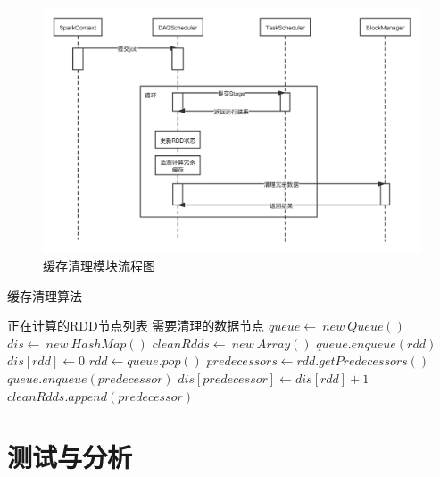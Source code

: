 \begin{figure}
    \centering
    \includegraphics[width=1\textwidth]{Img/缓存清理模块流程图.png}
    \caption{缓存清理模块流程图}
    \label{fig:clean}
\end{figure}

\begin{algorithm}  
    \caption{缓存清理算法}  
    \begin{algorithmic}[1] %
        \Require 正在计算的RDD节点列表
        \Ensure 需要清理的数据节点
            \State $queue \gets \ new \ Queue()$
            \State $dis \gets  \ new \ HashMap()$
            \State $cleanRdds \gets \ new \ Array()$
                \State $queue.enqueue(rdd)$
                \State $dis[rdd] \gets 0$
            \EndFor
                \State $rdd \gets queue.pop()$
                \State $predecessors \gets rdd.getPredecessors()$
                    \State $queue.enqueue(predecessor)$
                    \State $dis[predecessor] \gets dis[rdd]+1$
                        $cleanRdds.append(predecessor)$
                    \EndIf
                \EndFor
            \EndWhile
        \EndFunction
    \end{algorithmic}
    \label{alg:cal-dis}
\end{algorithm}

\section{测试与分析}

